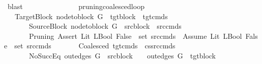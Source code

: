 \begin{isabellebody}
\ blast\isanewline
\ \ \ \ \ \ \isamarkupfalse%
\isanewline
\ \ \ \ \isamarkupfalse%
\isanewline
\ \ \isamarkupfalse%
\isanewline
{}\isamarkupfalse%
%
\endisatagproof
{\isafoldproof}%
%
\isadelimproof
%
\endisadelimproof
%
\isadelimdocument
%
\endisadelimdocument
%
\isatagdocument
%
\isamarkuptrue%
%
\endisatagdocument
{\isafolddocument}%
%
\isadelimdocument
%
\endisadelimdocument
{}\isamarkupfalse%
\ pruning{\isacharunderscore}{\kern0pt}coalesced{\isacharunderscore}{\kern0pt}loop{\isacharcolon}{\kern0pt}\isanewline
\ \ \ TargetBlock{\isacharcolon}{\kern0pt}\ {\isachardoublequoteopen}node{\isacharunderscore}{\kern0pt}to{\isacharunderscore}{\kern0pt}block\ G{\isacharprime}{\kern0pt}\ {\isacharbang}{\kern0pt}\ tgt{\isacharunderscore}{\kern0pt}block\ {\isacharequal}{\kern0pt}\ tgt{\isacharunderscore}{\kern0pt}cmds{\isachardoublequoteclose}\isanewline
\ \ \ \ \ \ \ SourceBlock{\isacharcolon}{\kern0pt}\ {\isachardoublequoteopen}node{\isacharunderscore}{\kern0pt}to{\isacharunderscore}{\kern0pt}block\ G\ {\isacharbang}{\kern0pt}\ src{\isacharunderscore}{\kern0pt}block\ {\isacharequal}{\kern0pt}\ src{\isacharunderscore}{\kern0pt}cmds{\isachardoublequoteclose}\isanewline
\ \ \ \ \ \ \ Pruning{\isacharcolon}{\kern0pt}\ {\isachardoublequoteopen}{\isacharparenleft}{\kern0pt}Assert\ {\isacharparenleft}{\kern0pt}Lit\ {\isacharparenleft}{\kern0pt}LBool\ False{\isacharparenright}{\kern0pt}{\isacharparenright}{\kern0pt}{\isacharparenright}{\kern0pt}\ {\isasymin}\ set\ {\isacharparenleft}{\kern0pt}src{\isacharunderscore}{\kern0pt}cmds{\isacharparenright}{\kern0pt}\ {\isasymor}\ {\isacharparenleft}{\kern0pt}Assume\ {\isacharparenleft}{\kern0pt}Lit\ {\isacharparenleft}{\kern0pt}LBool\ False{\isacharparenright}{\kern0pt}{\isacharparenright}{\kern0pt}{\isacharparenright}{\kern0pt}\ {\isasymin}\ set\ {\isacharparenleft}{\kern0pt}src{\isacharunderscore}{\kern0pt}cmds{\isacharparenright}{\kern0pt}{\isachardoublequoteclose}\isanewline
\ \ \ \ \ \ \ Coalesced{\isacharcolon}{\kern0pt}\ {\isachardoublequoteopen}tgt{\isacharunderscore}{\kern0pt}cmds\ {\isacharequal}{\kern0pt}\ cs{\isacharat}{\kern0pt}src{\isacharunderscore}{\kern0pt}cmds{\isachardoublequoteclose}\isanewline
\ \ \ \ \ \ \ NoSuccEq{\isacharcolon}{\kern0pt}\ {\isachardoublequoteopen}out{\isacharunderscore}{\kern0pt}edges\ G\ {\isacharbang}{\kern0pt}\ src{\isacharunderscore}{\kern0pt}block\ {\isacharequal}{\kern0pt}\ {\isacharbrackleft}{\kern0pt}{\isacharbrackright}{\kern0pt}\ {\isasymLongrightarrow}\ out{\isacharunderscore}{\kern0pt}edges\ G{\isacharprime}{\kern0pt}\ {\isacharbang}{\kern0pt}\ tgt{\isacharunderscore}{\kern0pt}block\ {\isacharequal}{\kern0pt}\ {\isacharbrackleft}{\kern0pt}{\isacharbrackright}{\kern0pt}{\isachardoublequoteclose}\isanewline

\end{isabellebody}
